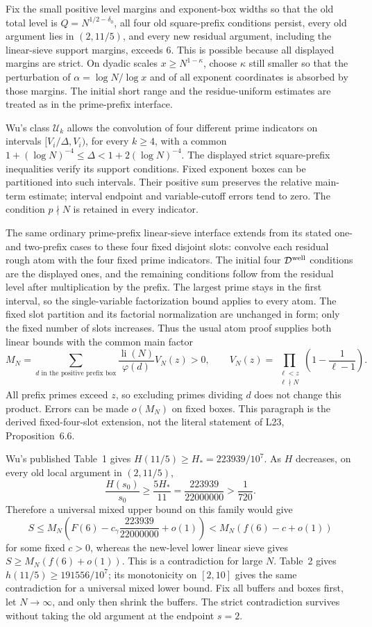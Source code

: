 \documentclass[11pt]{article}
\begin{document}
Fix the small positive level margins and exponent-box widths so that
the old total level is $Q=N^{1/2-\delta_0}$, all four old square-prefix
conditions persist, every old argument lies in $(2,11/5)$, and every
new residual argument, including the linear-sieve support margins,
exceeds $6$. This is possible because all displayed margins are
strict. On dyadic scales $x\ge N^{1-\kappa}$, choose $\kappa$ still
smaller so that the perturbation of $\alpha=\log N/\log x$ and of all
exponent coordinates is absorbed by those margins. The initial
short range and the residue-uniform estimates are treated as in the
prime-prefix interface.

Wu's class $\mathcal U_k$ allows the convolution of four different
prime indicators on intervals $[V_i/\Delta,V_i)$, for every $k\ge4$,
with a common $1+(\log N)^{-4}\le\Delta<1+2(\log N)^{-4}$.
The displayed strict square-prefix inequalities verify its support
conditions. Fixed exponent boxes can be partitioned into such
intervals. Their positive sum preserves the relative main-term
estimate; interval endpoint and variable-cutoff errors tend to zero.
The condition $p\nmid N$ is retained in every indicator.

The same ordinary prime-prefix linear-sieve interface extends from its
stated one- and two-prefix cases to these four fixed disjoint slots:
convolve each residual rough atom with the four fixed prime indicators.
The initial four $\mathcal D^{\rm well}$ conditions are the displayed
ones, and the remaining conditions follow from the residual level
after multiplication by the prefix. The largest prime stays in the
first interval, so the single-variable factorization bound applies to
every atom. The fixed slot partition and its factorial normalization
are unchanged in form; only the fixed number of slots increases.
Thus the usual atom proof supplies both linear bounds with the common
main factor
\[
 M_N=\sum_{d\text{ in the positive prefix box}}
       \frac{\operatorname{li}(N)}{\varphi(d)}V_N(z)>0,
 \qquad
 V_N(z)=\prod_{\substack{\ell<z\\\ell\nmid N}}
                 \left(1-\frac1{\ell-1}\right).
\]
All prefix primes exceed $z$, so excluding primes dividing $d$ does
not change this product. Errors can be made $o(M_N)$ on fixed boxes.
This paragraph is the derived fixed-four-slot extension, not the
literal statement of L23, Proposition~6.6.

Wu's published Table~1 gives $H(11/5)\ge H_*=223939/10^7$.
As $H$ decreases, on every old local argument in $(2,11/5)$,
\[
 \frac{H(s_0)}{s_0}\ge\frac{5H_*}{11}
 =\frac{223939}{22000000}>\frac1{720}.
\]
Therefore a universal mixed upper bound on this family would give
\[
 S\le M_N\left(F(6)-c_\gamma\frac{223939}{22000000}+o(1)\right)
       <M_N(f(6)-c+o(1))
\]
for some fixed $c>0$, whereas the new-level lower linear sieve gives
$S\ge M_N(f(6)+o(1))$. This is a contradiction for large $N$.
Table~2 gives $h(11/5)\ge191556/10^7$; its monotonicity on $[2,10]$
gives the same contradiction for a universal mixed lower bound.
Fix all buffers and boxes first, let $N\to\infty$, and only then
shrink the buffers. The strict contradiction survives without taking
the old argument at the endpoint $s=2$.
\end{document}
